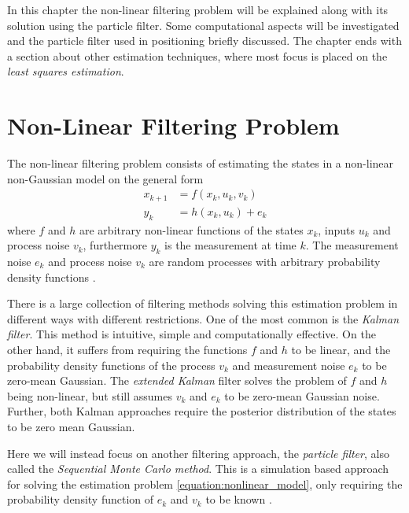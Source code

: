 \documentclass{LTHthesis}
\begin{document}
In this chapter the non-linear filtering problem will be explained along with its solution using the particle filter. Some computational aspects will be investigated and the particle filter used in positioning briefly discussed. The chapter ends with a section about other estimation techniques, where most focus is placed on the \emph{least squares estimation}.
%
\section{Non-Linear Filtering Problem}
\label{sec:nlfp}
The non-linear filtering problem consists of estimating the states in a non-linear non-Gaussian model on the general form
%
\begin{subequations}
\label{equation:nonlinear_model}
\begin{align}
x_{k+1} &= f(x_k,u_k,v_k) \label{equation:nonlinear_model_first}\\
y_k&=h(x_k,u_k) + e_k
\label{equation:nonlinear_model_second}
\end{align}
\end{subequations} 
%
where $f$ and $h$ are arbitrary non-linear functions of the states $x_k$, inputs $u_k$ and process noise $v_k$, furthermore $y_k$ is the measurement at time $k$. The measurement noise $e_k$ and process noise $v_k$ are random processes with arbitrary probability density functions \cite{gson12}. 

There is a large collection of filtering methods solving this estimation problem in different ways with different restrictions. One of the most common is the \emph{Kalman filter}. This method is intuitive, simple and computationally effective. On the other hand, it suffers from requiring the functions $f$ and $h$ to be linear, and the probability density functions of the process $v_k$ and measurement noise $e_k$ to be zero-mean Gaussian. The \emph{extended Kalman} filter solves the problem of $f$ and $h$ being non-linear, but still assumes $v_k$ and $e_k$ to be zero-mean Gaussian noise. Further, both Kalman approaches require the posterior distribution of the states to be zero mean Gaussian.

Here we will instead focus on another filtering approach, the \emph{particle filter}, also called the \emph{Sequential Monte Carlo method}. This is a simulation based approach for solving the estimation problem \ref{equation:nonlinear_model}, only requiring the probability density function of $e_k$ and $v_k$ to be known \cite{gson12,fig_fra10}.  
\end{document}
